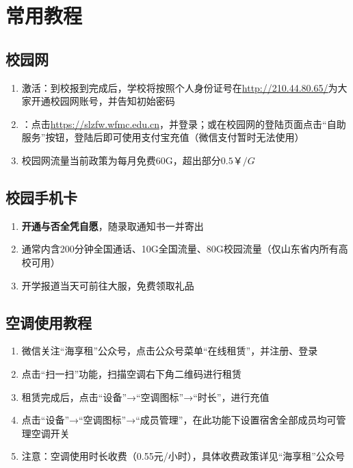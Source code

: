 \chapter[常用教程]{常用教程}

\section[校园网]{校园网}
\begin{enumerate}
    \item 激活：到校报到完成后，学校将按照个人身份证号在\uline{\href{http://210.44.80.65/}{http://210.44.80.65/}}为大家开通校园网账号，并告知初始密码\footnotemark
    \item \textbf{}：点击\uline{\href{https://slzfw.wfmc.edu.cn}{https://slzfw.wfmc.edu.cn}}，并登录；或在校园网的登陆页面点击“自助服务”按钮\footnotemark，登陆后即可使用支付宝充值（微信支付暂时无法使用）
    \item 校园网流量当前政策为每月免费60G，超出部分$0.5￥/G$
\end{enumerate}

\section[校园手机卡]{校园手机卡}
\begin{enumerate}
    \item \textbf{开通与否全凭自愿}，随录取通知书一并寄出
    \item 通常内含200分钟全国通话、10G全国流量、80G校园流量（仅山东省内所有高校可用）
    \item 开学报道当天可前往大服，免费领取礼品
\end{enumerate}

\section[空调使用教程]{空调使用教程}
\begin{enumerate}
    \item 微信关注“海享租”公众号，点击公众号菜单“在线租赁”，并注册、登录
    \item 点击“扫一扫”功能，扫描空调右下角二维码进行租赁
    \item 租赁完成后，点击“设备”→“空调图标”→“时长”，进行充值
    \item 点击“设备”→“空调图标”→“成员管理”，在此功能下设置宿舍全部成员均可管理空调开关
    \item 注意：空调使用时长收费（0.55元/小时），具体收费政策详见“海享租”公众号
\end{enumerate}

